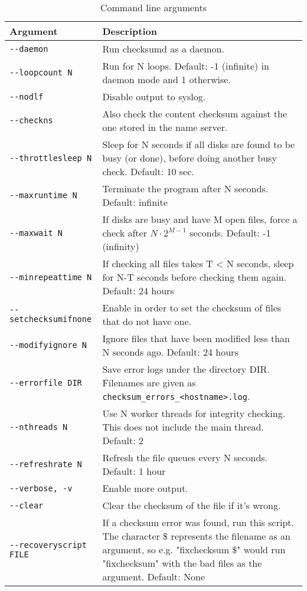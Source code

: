 \begin{table}[H]
\begin{tabular}{lp{10cm}}
\hline
{\bf Argument}              & {\bf Description}\\
\hline
{\tt -{}-daemon}              & Run checksumd as a daemon.\\
{\tt -{}-loopcount N}         & Run for N loops. Default: -1 (infinite) in daemon mode and 1 otherwise.\\
{\tt -{}-nodlf}               & Disable output to syslog.\\
{\tt -{}-checkns}             & Also check the content checksum against the one stored in the name server.\\
{\tt -{}-throttlesleep N}     & Sleep for N seconds if all disks are found to be busy (or done), before doing another busy check. Default: 10 sec.\\
{\tt -{}-maxruntime N}        & Terminate the program after N seconds. Default: infinite\\
{\tt -{}-maxwait N}           & If disks are busy and have M open files, force a check after $N\cdot 2^{M-1}$ seconds. Default: -1 (infinity)\\
{\tt -{}-minrepeattime N}     & If checking all files takes T < N seconds, sleep for N-T seconds before checking them again. Default: 24 hours\\
{\tt -{}-setchecksumifnone}   & Enable in order to set the checksum of files that do not have one.\\
{\tt -{}-modifyignore N}      & Ignore files that have been modified less than N seconds ago. Default: 24 hours\\
{\tt -{}-errorfile DIR}       & Save error logs under the directory DIR. Filenames are given as {\tt checksum\_errors\_<hostname>.log}.\\
{\tt -{}-nthreads N}          & Use N worker threads for integrity checking. This does not include the main thread. Default: 2\\
{\tt -{}-refreshrate N}       & Refresh the file queues every N seconds. Default: 1 hour\\
{\tt -{}-verbose, -v}         & Enable more output.\\
{\tt -{}-clear}               & Clear the checksum of the file if it's wrong.\\
{\tt -{}-recoveryscript FILE} & If a checksum error was found, run this script. The character \$ represents the filename as an argument, so e.g. "fixchecksum \$" would run "fixchecksum" with the bad files as the argument. Default: None\\

\hline
\end{tabular}
\caption{Command line arguments}
\label{tab:cmdlineargs}
\end{table}

